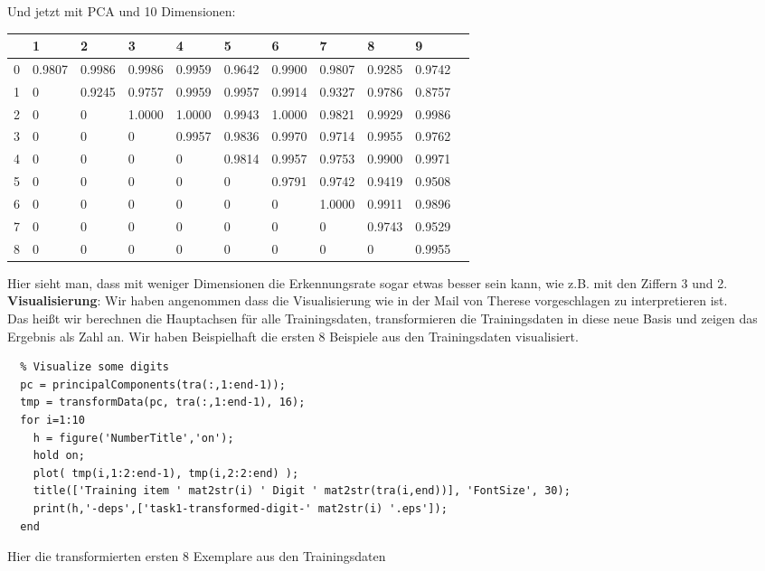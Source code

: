\documentclass{article}
\begin{document}
Und jetzt mit PCA und 10 Dimensionen:
	\begin{table}[H]
	    \begin{tabular}{|l|l|l|l|l|l|l|l|l|l|l|}
	        \hline
          &1         &2         &3         &4         &5         &6         &7         &8         &9 \\ \hline
         0&    0.9807&    0.9986&    0.9986&    0.9959&    0.9642&    0.9900&    0.9807&    0.9285&    0.9742\\ 
         1&         0&    0.9245&    0.9757&    0.9959&    0.9957&    0.9914&    0.9327&    0.9786&    0.8757\\ 
         2&         0&         0&    1.0000&    1.0000&    0.9943&    1.0000&    0.9821&    0.9929&    0.9986\\ 
         3&         0&         0&         0&    0.9957&    0.9836&    0.9970&    0.9714&    0.9955&    0.9762\\ 
         4&         0&         0&         0&         0&    0.9814&    0.9957&    0.9753&    0.9900&    0.9971\\ 
         5&         0&         0&         0&         0&         0&    0.9791&    0.9742&    0.9419&    0.9508\\ 
         6&         0&         0&         0&         0&         0&         0&    1.0000&    0.9911&    0.9896\\ 
         7&         0&         0&         0&         0&         0&         0&         0&    0.9743&    0.9529\\ 
         8&         0&         0&         0&         0&         0&         0&         0&         0&    0.9955\\ 
	        \hline
	    \end{tabular}
	\end{table}
        Hier sieht man, dass mit weniger Dimensionen die
        Erkennungsrate sogar etwas besser sein kann, wie z.B. mit den
        Ziffern 3 und 2.\\
        
        \textbf{Visualisierung}:
        Wir haben angenommen dass die Visualisierung wie in der Mail von Therese vorgeschlagen zu interpretieren ist.\\
        Das heißt wir berechnen die Hauptachsen für alle Trainingsdaten, transformieren die Trainingsdaten in diese neue Basis
        und zeigen das Ergebnis als Zahl an. Wir haben Beispielhaft die ersten 8 Beispiele aus den Trainingsdaten visualisiert.
        
		\begin{lstlisting}
  % Visualize some digits
  pc = principalComponents(tra(:,1:end-1));
  tmp = transformData(pc, tra(:,1:end-1), 16);
  for i=1:10
    h = figure('NumberTitle','on');
    hold on;
    plot( tmp(i,1:2:end-1), tmp(i,2:2:end) );
    title(['Training item ' mat2str(i) ' Digit ' mat2str(tra(i,end))], 'FontSize', 30);
    print(h,'-deps',['task1-transformed-digit-' mat2str(i) '.eps']);
  end
		\end{lstlisting} 
		Hier die transformierten ersten 8 Exemplare aus den Trainingsdaten
		
\end{document}
